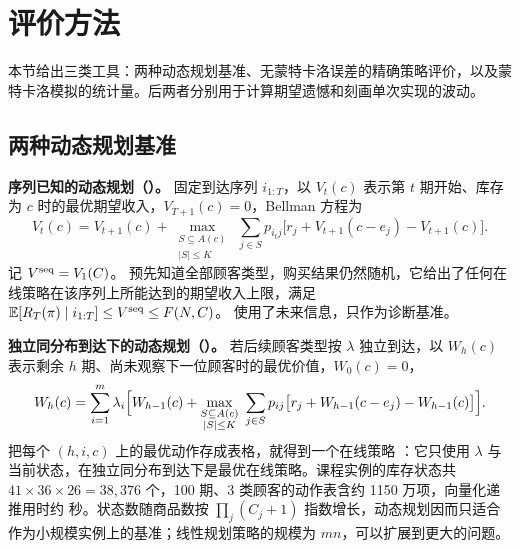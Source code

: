 \section{评价方法}\label{sec:eval}
本节给出三类工具：两种动态规划基准、无蒙特卡洛误差的精确策略评价，以及蒙特卡洛模拟的统计量。后两者分别用于计算期望遗憾和刻画单次实现的波动。

\subsection{两种动态规划基准}
\textbf{序列已知的动态规划（\SeqDP）。} 固定到达序列 $i_{1:T}$，以 $V_t(c)$ 表示第 $t$ 期开始、库存为 $c$ 时的最优期望收入，$V_{T+1}(c)=0$，Bellman 方程为
\begin{equation}
V_t(c)=V_{t+1}(c)+\max_{\substack{S\subseteq A(c)\\|S|\le K}}\ \sum_{j\in S}p_{i_tj}\bigl[r_j+V_{t+1}(c-e_j)-V_{t+1}(c)\bigr].
\label{eq:seqdp}
\end{equation}
记 $V^{\mathrm{seq}}=V_1(C)$。\SeqDP{} 预先知道全部顾客类型，购买结果仍然随机，它给出了任何在线策略在该序列上所能达到的期望收入上限，满足 $\mathbb E[R_T(\pi)\mid i_{1:T}]\le V^{\mathrm{seq}}\le F(N,C)$。\SeqDP{} 使用了未来信息，只作为诊断基准。

\textbf{独立同分布到达下的动态规划（\IIDDP）。} 若后续顾客类型按 $\lambda$ 独立到达，以 $W_h(c)$ 表示剩余 $h$ 期、尚未观察下一位顾客时的最优价值，$W_0(c)=0$，
\begin{equation}
W_h(c)=\sum_{i=1}^{m}\lambda_i\Bigl[W_{h-1}(c)+\max_{\substack{S\subseteq A(c)\\|S|\le K}}\ \sum_{j\in S}p_{ij}\bigl[r_j+W_{h-1}(c-e_j)-W_{h-1}(c)\bigr]\Bigr].
\label{eq:iiddp}
\end{equation}
把每个 $(h,i,c)$ 上的最优动作存成表格，就得到一个在线策略 \IIDDP{}：它只使用 $\lambda$ 与当前状态，在独立同分布到达下是最优在线策略。课程实例的库存状态共 $41\times36\times26=38{,}376$ 个，100 期、3 类顾客的动作表含约 1150 万项，向量化递推用时约 \IIDSeconds{} 秒。状态数随商品数按 $\prod_j(C_j+1)$ 指数增长，动态规划因而只适合作为小规模实例上的基准；线性规划策略的规模为 $mn$，可以扩展到更大的问题。

